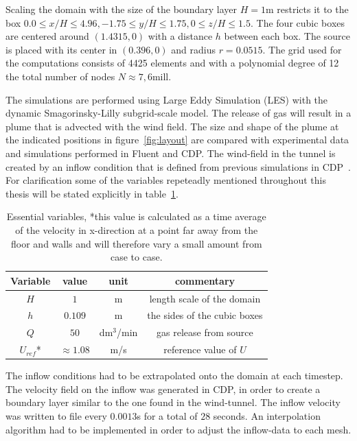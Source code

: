 Scaling the domain with the size of the boundary layer $H =1$m restricts it to
the box $0.0\leq x/H \leq 4.96,-1.75\leq y/H \leq 1.75, 0\leq z/H \leq 1.5$.
The four cubic boxes are centered around $(1.4315,0)$ with a distance $h$ between each box.
The source is placed with its center in $(0.396,0)$ and radius $r = 0.0515$.
The grid used for the computations consists of 4425 elements and with a polynomial degree of
12 the total number of nodes $N\approx 7,6$mill. 


The simulations are performed using Large Eddy Simulation (LES) 
with the dynamic Smagorinsky-Lilly subgrid-scale model. 
The release of gas will result in a plume that is advected with the wind field. The size and 
shape of the plume at the indicated positions in figure~\ref{fig:layout} are compared with 
experimental data and simulations performed in Fluent and CDP\@. 
The wind-field in the tunnel is created by an inflow condition that is defined from previous 
simulations in CDP~\cite{eriksson}.
For clarification some of the variables repeteadly mentioned throughout this thesis will be 
stated explicitly in table~\ref{tab:simplevariables}.
\begin{table}
    \centering
    \begin{tabular}{c c c c}
        Variable & value & unit & commentary \\ \hline
        $H$   & $1$ & m & length scale of the domain \\ 
        $h$   & $0.109$ & m & the sides of the cubic boxes\\ 
        $Q$   & $50$ & dm$^3$/min & gas release from source \\ 
        $U_{ref} $*& $\approx1.08$ & m/s & reference value of $U$ \\
    \end{tabular}
    \caption{Essential variables, *this value is calculated as a time average of the velocity in 
        x-direction at a point far away from the floor and walls and will therefore 
        vary a small amount from case to case. }
    \label{tab:simplevariables}
\end{table}

The inflow conditions had to be extrapolated onto the domain at each timestep. The velocity field
on the inflow was generated in CDP, in order to create a boundary layer similar to the one found
in the wind-tunnel. The inflow velocity was written to file every 
$0.0013$s for a total of $28$ seconds. An interpolation algorithm had to be implemented in order
to adjust the inflow-data to each mesh.

